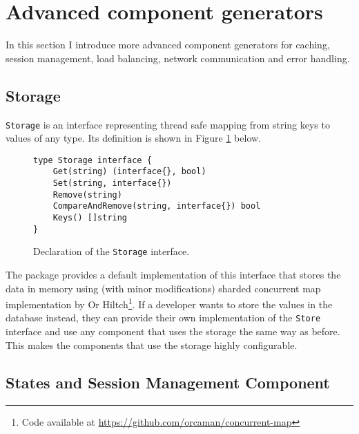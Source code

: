 \section{Advanced component generators}
\label{sec:impl2}
In this section I introduce more advanced component generators for caching,
session management, load balancing, network communication and error handling.

\subsection{Storage}
\texttt{Storage} is an interface representing thread safe mapping from string keys
to values of any type. Its definition is shown in Figure \ref{fig:Storage} below.
\begin{figure}[h]
\centering
\begin{lstlisting}
type Storage interface {
    Get(string) (interface{}, bool)
    Set(string, interface{})
    Remove(string)
    CompareAndRemove(string, interface{}) bool
    Keys() []string
}
\end{lstlisting}
\caption[scale=1.0]{Declaration of the \texttt{Storage} interface.}
\label{fig:Storage}
\end{figure}
The package provides a default implementation of this interface that
stores the data in memory using (with minor modifications) sharded concurrent map implementation
by Or Hiltch\footnote{Code available at \url{https://github.com/orcaman/concurrent-map}}.
If a developer wants to store the values in the 
database instead, they can provide their own implementation of the 
\texttt{Store} interface
and use any component that uses the storage the same way as before.
This makes the components that use the storage highly configurable.

\subsection{States and Session Management Component}
